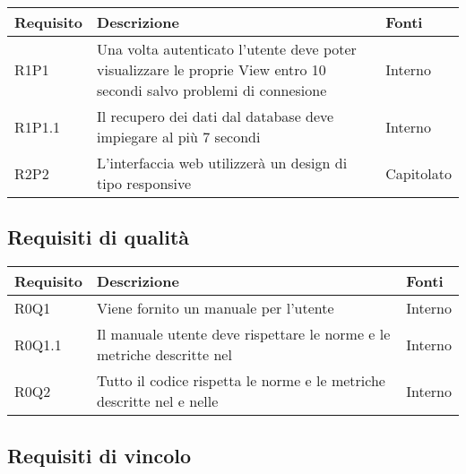 \begin{center}

	\def\arraystretch{1.5}
	\bgroup
	\begin{longtable}{| p{2cm} | p{8cm} | p{2cm} |}

		\hline
		\textbf{Requisito} & \textbf{Descrizione} & \textbf{Fonti} \\
		\hline

		R1P1  &  Una volta autenticato l'utente deve poter visualizzare le proprie View entro 10 secondi salvo problemi di connesione &  Interno \\
		\hline
		R1P1.1  &  Il recupero dei dati dal database deve impiegare al più 7 secondi  &  Interno \\
		\hline
		R2P2  &  L'interfaccia web utilizzerà un design di tipo responsive  &  Capitolato \\
		\hline

	\end{longtable}
	\egroup
\end{center}

\subsection{Requisiti di qualità}

\begin{center}

	\def\arraystretch{1.5}
	\bgroup
	\begin{longtable}{| p{2cm} | p{8cm} | p{2cm} |}

		\hline
		\textbf{Requisito} & \textbf{Descrizione} & \textbf{Fonti} \\
		\hline

		R0Q1  &  Viene fornito un manuale per l'utente  &  Interno \\
		\hline
		R0Q1.1  &  Il manuale utente deve rispettare le norme e le metriche descritte nel \docNameVersionPdQ  &  Interno \\
		\hline
		R0Q2  &  Tutto il codice rispetta le norme e le metriche descritte nel \docNameVersionPdQ{} e nelle \docNameVersionNdP  &  Interno \\
		\hline


	\end{longtable}
	\egroup
\end{center}

\subsection{Requisiti di vincolo}

